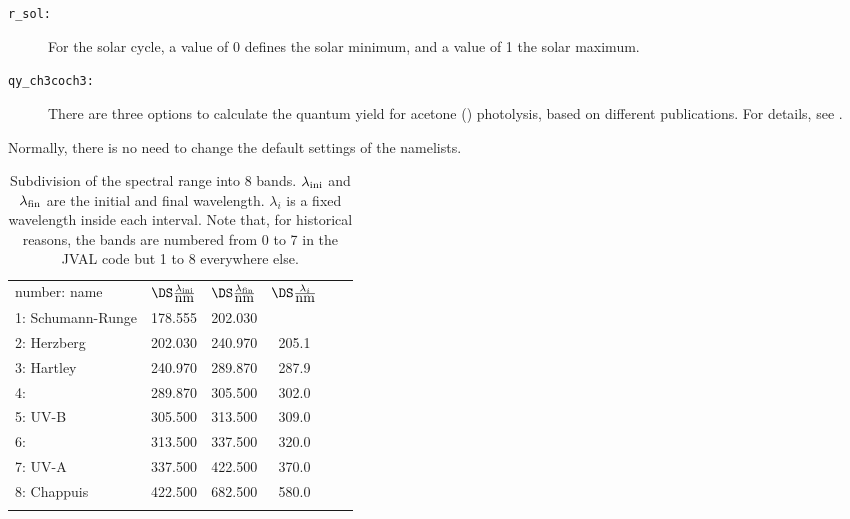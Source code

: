 \documentclass[a4paper,twoside]{article}
\newcommand{\IT}[1]{#1\index{#1}}
\newcommand{\middlehline}{\noalign{\vspace{1mm}}\hline\noalign{\vspace{1mm}}}
\newcommand{\bottomhline}{\noalign{\vspace{1mm}}\hline}
\begin{document}
\begin{description}
\item[\tt r\_sol:] For the solar cycle, a value of 0 defines the solar
  minimum, and a value of 1 the solar maximum.
\item[\tt qy\_ch3coch3:] There are three options to calculate the
  quantum yield for acetone () photolysis, based on
  different publications. For details, see
  .
\end{description}

Normally, there is no need to change the default settings of the
namelists.

\begin{table}
  \begin{center}
    \caption{Subdivision of the spectral range into 8 bands.
      $\lambda_{\rm ini}$ and $\lambda_{\rm fin}$ are the initial and
      final wavelength. $\lambda_i$ is a fixed wavelength inside each
      interval. Note that, for historical reasons, the bands are
      numbered from 0 to 7 in the \IT{JVAL} code but 1 to 8 everywhere else.}
    \label{tab:eightbands}
    \begin{tabular}{lccccc}
      \middlehline
      number: name & 
      $\DS\frac{\lambda_{\rm ini}}{\mbox{nm}}$ & 
      $\DS\frac{\lambda_{\rm fin}}{\mbox{nm}}$ &
      $\DS\frac{\lambda_i}{\mbox{nm}}$\\
      \middlehline
      1: Schumann-Runge & 178.555 & 202.030 & \\
      2: Herzberg       & 202.030 & 240.970 & 205.1\\
      3: Hartley        & 240.970 & 289.870 & 287.9\\
      4:                & 289.870 & 305.500 & 302.0\\
      5: UV-B           & 305.500 & 313.500 & 309.0\\
      6:                & 313.500 & 337.500 & 320.0\\
      7: UV-A           & 337.500 & 422.500 & 370.0\\
      8: Chappuis       & 422.500 & 682.500 & 580.0\\
      \bottomhline
    \end{tabular}
  \end{center}
\end{table}
\end{document}
